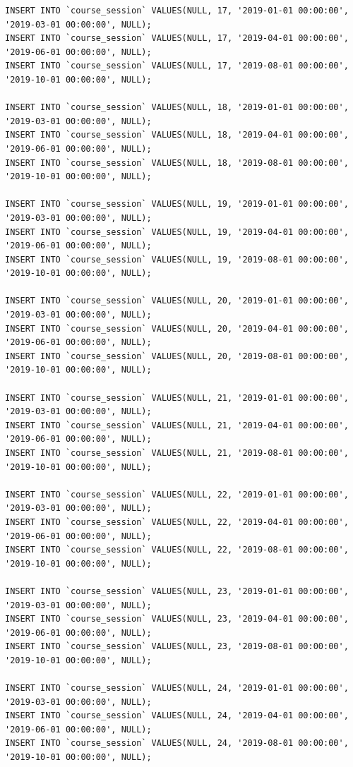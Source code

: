 \documentclass[12pt,a4paper,titlepage]{article}
\begin{document}
\begin{lstlisting}
INSERT INTO `course_session` VALUES(NULL, 17, '2019-01-01 00:00:00', '2019-03-01 00:00:00', NULL);
INSERT INTO `course_session` VALUES(NULL, 17, '2019-04-01 00:00:00', '2019-06-01 00:00:00', NULL);
INSERT INTO `course_session` VALUES(NULL, 17, '2019-08-01 00:00:00', '2019-10-01 00:00:00', NULL);

INSERT INTO `course_session` VALUES(NULL, 18, '2019-01-01 00:00:00', '2019-03-01 00:00:00', NULL);
INSERT INTO `course_session` VALUES(NULL, 18, '2019-04-01 00:00:00', '2019-06-01 00:00:00', NULL);
INSERT INTO `course_session` VALUES(NULL, 18, '2019-08-01 00:00:00', '2019-10-01 00:00:00', NULL);

INSERT INTO `course_session` VALUES(NULL, 19, '2019-01-01 00:00:00', '2019-03-01 00:00:00', NULL);
INSERT INTO `course_session` VALUES(NULL, 19, '2019-04-01 00:00:00', '2019-06-01 00:00:00', NULL);
INSERT INTO `course_session` VALUES(NULL, 19, '2019-08-01 00:00:00', '2019-10-01 00:00:00', NULL);

INSERT INTO `course_session` VALUES(NULL, 20, '2019-01-01 00:00:00', '2019-03-01 00:00:00', NULL);
INSERT INTO `course_session` VALUES(NULL, 20, '2019-04-01 00:00:00', '2019-06-01 00:00:00', NULL);
INSERT INTO `course_session` VALUES(NULL, 20, '2019-08-01 00:00:00', '2019-10-01 00:00:00', NULL);

INSERT INTO `course_session` VALUES(NULL, 21, '2019-01-01 00:00:00', '2019-03-01 00:00:00', NULL);
INSERT INTO `course_session` VALUES(NULL, 21, '2019-04-01 00:00:00', '2019-06-01 00:00:00', NULL);
INSERT INTO `course_session` VALUES(NULL, 21, '2019-08-01 00:00:00', '2019-10-01 00:00:00', NULL);

INSERT INTO `course_session` VALUES(NULL, 22, '2019-01-01 00:00:00', '2019-03-01 00:00:00', NULL);
INSERT INTO `course_session` VALUES(NULL, 22, '2019-04-01 00:00:00', '2019-06-01 00:00:00', NULL);
INSERT INTO `course_session` VALUES(NULL, 22, '2019-08-01 00:00:00', '2019-10-01 00:00:00', NULL);

INSERT INTO `course_session` VALUES(NULL, 23, '2019-01-01 00:00:00', '2019-03-01 00:00:00', NULL);
INSERT INTO `course_session` VALUES(NULL, 23, '2019-04-01 00:00:00', '2019-06-01 00:00:00', NULL);
INSERT INTO `course_session` VALUES(NULL, 23, '2019-08-01 00:00:00', '2019-10-01 00:00:00', NULL);

INSERT INTO `course_session` VALUES(NULL, 24, '2019-01-01 00:00:00', '2019-03-01 00:00:00', NULL);
INSERT INTO `course_session` VALUES(NULL, 24, '2019-04-01 00:00:00', '2019-06-01 00:00:00', NULL);
INSERT INTO `course_session` VALUES(NULL, 24, '2019-08-01 00:00:00', '2019-10-01 00:00:00', NULL);


\end{lstlisting}
\end{document}

